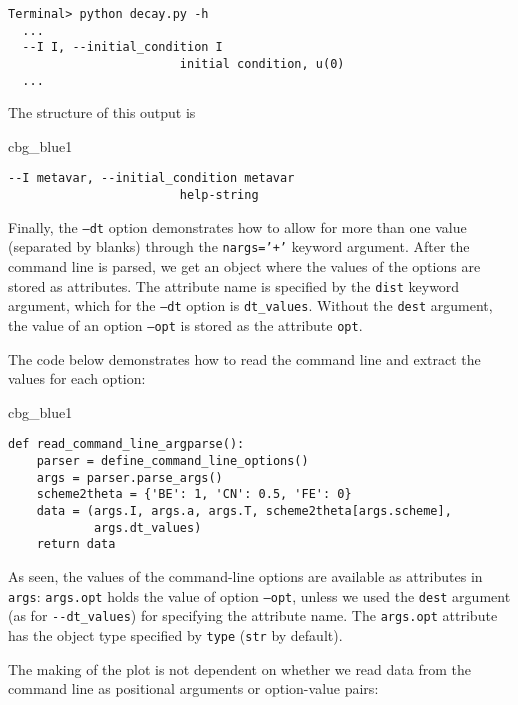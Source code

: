 \documentclass[graybox,sectrefs,envcountresetchap,open=right,final]{svmonodo}
\newenvironment{_cod_tight}[1]{
   \def\FrameCommand{\colorbox{#1}}
   \FrameRule0.6pt\MakeFramed {\FrameRestore}\vskip3mm}
   {\vskip0mm\endMakeFramed}
\newenvironment{cod}[1]{
\bgroup\rmfamily
\fboxsep=0mm\relax
\begin{_cod_tight}{#1}
\list{}{\parsep=-2mm\parskip=0mm\topsep=0pt\leftmargin=2mm
\rightmargin=2\leftmargin\leftmargin=4pt\relax}
\item\relax}
{\endlist\end{_cod_tight}\egroup}
\begin{document}
\begin{Verbatim}[frame=lines,label=\fbox{{\tiny Terminal}},framesep=2.5mm,framerule=0.7pt,fontsize=\fontsize{9pt}{9pt}]
Terminal> python decay.py -h
  ...
  --I I, --initial_condition I
                        initial condition, u(0)
  ...
\end{Verbatim}
The structure of this output is

\begin{cod}{cbg_blue1}\begin{Verbatim}[numbers=none,fontsize=\fontsize{9pt}{9pt},baselinestretch=0.95,xleftmargin=2mm]
  --I metavar, --initial_condition metavar
                        help-string
\end{Verbatim}
\end{cod}
\noindent



Finally, the \texttt{--dt} option demonstrates how to allow for more than one
value (separated by blanks) through the \texttt{nargs='+'} keyword argument.
After the command line is parsed, we get an object where the values of
the options are stored as attributes. The attribute name is specified
by the \texttt{dist} keyword argument, which for the \texttt{--dt} option is
\Verb!dt_values!. Without the \texttt{dest} argument, the value of an option \texttt{--opt}
is stored as the attribute \texttt{opt}.

The code below demonstrates how to read the command line and extract
the values for each option:

\begin{cod}{cbg_blue1}\begin{Verbatim}[numbers=none,fontsize=\fontsize{9pt}{9pt},baselinestretch=0.95,xleftmargin=2mm]
def read_command_line_argparse():
    parser = define_command_line_options()
    args = parser.parse_args()
    scheme2theta = {'BE': 1, 'CN': 0.5, 'FE': 0}
    data = (args.I, args.a, args.T, scheme2theta[args.scheme],
            args.dt_values)
    return data
\end{Verbatim}
\end{cod}
\noindent
As seen, the values of the command-line options are available as
attributes in \texttt{args}: \texttt{args.opt} holds the value of option \texttt{--opt}, unless
we used the \texttt{dest} argument (as for \Verb!--dt_values!) for specifying the
attribute name. The \texttt{args.opt} attribute has the object type specified
by \texttt{type} (\texttt{str} by default).

The making of the plot is not dependent on whether we read data from
the command line as positional arguments or option-value pairs:
\end{document}
